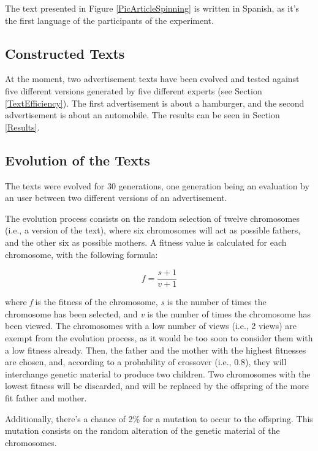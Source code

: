 \documentclass{acm_proc_article-sp}
\begin{document}
The text presented in Figure \ref{PicArticleSpinning} is written in
Spanish, as it's the first language of the participants of the
experiment.

\subsection{Constructed Texts}

At the moment, two advertisement texts have been evolved and tested
against five different versions generated by five different experts
(see Section \ref{TextEfficiency}). The first advertisement is about a
hamburger, and the second advertisement is about an automobile. The results
can be seen in Section \ref{Results}.

\subsection{Evolution of the Texts}
\label{EvolutionProcess}

The texts were evolved for 30 generations, one generation being an
evaluation by an user between two different versions of an
advertisement.

The evolution process consists on the random selection of twelve
chromosomes (i.e., a version of the text), where six chromosomes will
act as possible fathers, and the other six as possible mothers. A
fitness value is calculated for each chromosome, with the following
formula:

\begin{equation}
  f = \frac{s + 1}{v + 1}
\end{equation}

where \textit{f} is the fitness of the chromosome, \textit{s} is the
number of times the chromosome has been selected, and \textit{v} is
the number of times the chromosome has been viewed. The chromosomes
with a low number of views (i.e., 2 views) are exempt from the
evolution process, as it would be too soon to consider them with a low
fitness already. Then, the father and the mother with the highest
fitnesses are chosen, and, according to a probability of crossover
(i.e., 0.8), they will interchange genetic material to produce two
children. Two chromosomes with the lowest fitness will be discarded,
and will be replaced by the offspring of the more fit father and
mother.

Additionally, there's a chance of 2\% for a mutation to occur to the
offspring. This mutation consists on the random alteration of the
genetic material of the chromosomes.
\end{document}
